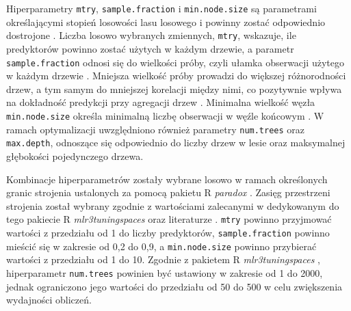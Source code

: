 \documentclass{amuthesis}
\begin{document}
Hiperparametry \texttt{mtry}, \texttt{sample.fraction} i
\texttt{min.node.size} są parametrami określającymi stopień losowości
lasu losowego i powinny zostać odpowiednio dostrojone
\autocite{probst_2019_hyperparameters}. Liczba losowo wybranych
zmiennych, \texttt{mtry}, wskazuje, ile predyktorów powinno zostać
użytych w każdym drzewie, a parametr \texttt{sample.fraction} odnosi się
do wielkości próby, czyli ułamka obserwacji użytego w każdym drzewie
\autocite{lovelace_2019_geocomputation}. Mniejsza wielkość próby
prowadzi do większej różnorodności drzew, a tym samym do mniejszej
korelacji między nimi, co pozytywnie wpływa na dokładność predykcji przy
agregacji drzew \autocite{probst_2019_hyperparameters}. Minimalna
wielkość węzła \texttt{min.node.size} określa minimalną liczbę
obserwacji w węźle końcowym \autocite{probst_2019_hyperparameters}. W
ramach optymalizacji uwzględniono również parametry \texttt{num.trees}
oraz \texttt{max.depth}, odnoszące się odpowiednio do liczby drzew w
lesie oraz maksymalnej głębokości pojedynczego drzewa.

Kombinacje hiperparametrów zostały wybrane losowo w ramach określonych
granic strojenia ustalonych za pomocą pakietu R \emph{paradox}
\autocite{R-paradox}. Zasięg przestrzeni strojenia został wybrany
zgodnie z wartościami zalecanymi w dedykowanym do tego pakiecie R
\emph{mlr3tuningspaces} \autocite{R-mlr3tuningspaces} oraz literaturze
\autocite{probst_2019_hyperparameters,schratz_2019_hyperparameters}.
\texttt{mtry} powinno przyjmować wartości z przedziału od 1 do liczby
predyktorów, \texttt{sample.fraction} powinno mieścić się w zakresie od
0,2 do 0,9, a \texttt{min.node.size} powinno przybierać wartości z
przedziału od 1 do 10. Zgodnie z pakietem R \emph{mlr3tuningspaces}
\autocite{R-mlr3tuningspaces}, hiperparametr \texttt{num.trees} powinien
być ustawiony w zakresie od 1 do 2000, jednak ograniczono jego wartości
do przedziału od 50 do 500 w celu zwiększenia wydajności obliczeń.
\end{document}
